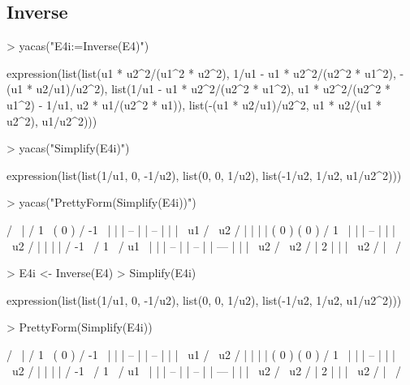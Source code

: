 \documentclass[]{article}
\begin{document}
\subsection{Inverse} 

\begin{Schunk}
\begin{Sinput}
> yacas("E4i:=Inverse(E4)")
\end{Sinput}
\begin{Soutput}
expression(list(list(u1 * u2^2/(u1^2 * u2^2), 1/u1 - u1 * u2^2/(u2^2 * 
    u1^2), -(u1 * u2/u1)/u2^2), list(1/u1 - u1 * u2^2/(u2^2 * 
    u1^2), u1 * u2^2/(u2^2 * u1^2) - 1/u1, u2 * u1/(u2^2 * u1)), 
    list(-(u1 * u2/u1)/u2^2, u1 * u2/(u1 * u2^2), u1/u2^2)))
\end{Soutput}
\begin{Sinput}
> yacas("Simplify(E4i)")
\end{Sinput}
\begin{Soutput}
expression(list(list(1/u1, 0, -1/u2), list(0, 0, 1/u2), list(-1/u2, 
    1/u2, u1/u2^2)))
\end{Soutput}
\begin{Sinput}
> yacas("PrettyForm(Simplify(E4i))")
\end{Sinput}
\begin{Soutput}
/                        \
| / 1  \ ( 0 )  / -1 \   |
| | -- |        | -- |   |
| \ u1 /        \ u2 /   |
|                        |
| ( 0 )  ( 0 )  / 1  \   |
|               | -- |   |
|               \ u2 /   |
|                        |
| / -1 \ / 1  \ / u1  \  |
| | -- | | -- | | --- |  |
| \ u2 / \ u2 / |   2 |  |
|               \ u2  /  |
\                        /
\end{Soutput}
\end{Schunk}


\begin{Schunk}
\begin{Sinput}
> E4i <- Inverse(E4)
> Simplify(E4i)
\end{Sinput}
\begin{Soutput}
expression(list(list(1/u1, 0, -1/u2), list(0, 0, 1/u2), list(-1/u2, 
    1/u2, u1/u2^2)))
\end{Soutput}
\begin{Sinput}
> PrettyForm(Simplify(E4i))
\end{Sinput}
\begin{Soutput}
/                        \
| / 1  \ ( 0 )  / -1 \   |
| | -- |        | -- |   |
| \ u1 /        \ u2 /   |
|                        |
| ( 0 )  ( 0 )  / 1  \   |
|               | -- |   |
|               \ u2 /   |
|                        |
| / -1 \ / 1  \ / u1  \  |
| | -- | | -- | | --- |  |
| \ u2 / \ u2 / |   2 |  |
|               \ u2  /  |
\                        /
\end{Soutput}
\end{Schunk}
\end{document}
